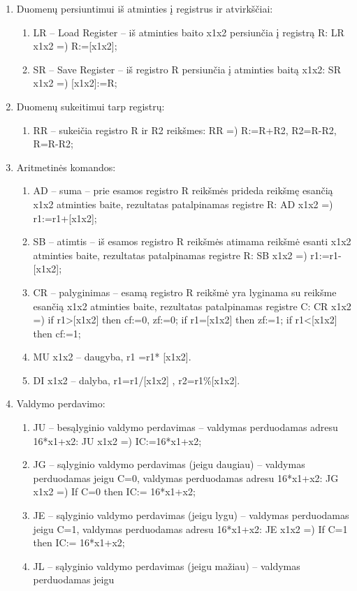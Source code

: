 \documentclass[oneside]{VUMIFPSkursinis}
\begin{document}
\begin{enumerate}
\item Duomenų persiuntimui iš atminties į registrus ir atvirkščiai:
\begin{enumerate}
\item  LR – Load Register – iš atminties baito x1x2 persiunčia į registrą R:
LR x1x2 =) R:=[x1x2];
\item SR – Save Register – iš registro R persiunčia į atminties baitą x1x2:
SR x1x2 =) [x1x2]:=R;
\end{enumerate}
\item Duomenų sukeitimui tarp registrų:
\begin{enumerate}
\item RR – sukeičia registro R ir R2 reikšmes:
RR =) R:=R+R2, R2=R-R2, R=R-R2;
\end{enumerate}
\item Aritmetinės komandos:
\begin{enumerate}
\item AD – suma – prie esamos registro R reikšmės prideda reikšmę esančią x1x2 atminties
baite, rezultatas patalpinamas registre R:
AD x1x2 =) r1:=r1+[x1x2];
\item SB – atimtis – iš esamos registro R reikšmės atimama reikšmė esanti x1x2 atminties
baite, rezultatas patalpinamas registre R:
SB x1x2 =) r1:=r1-[x1x2];
\item CR – palyginimas – esamą registro R reikšmė yra lyginama su reikšme esančią x1x2
atminties baite, rezultatas patalpinamas registre C:
CR x1x2 =)
if r1>[x1x2] then cf:=0, zf:=0;
if r1=[x1x2] then zf:=1;
if r1<[x1x2] then cf:=1;
\item MU x1x2 – daugyba, r1 =r1* [x1x2].
\item DI x1x2 – dalyba, r1=r1/[x1x2] , r2=r1\%[x1x2].
\end{enumerate}
\item Valdymo perdavimo:
\begin{enumerate}
\item JU – besąlyginio valdymo perdavimas – valdymas perduodamas adresu 16*x1+x2:
JU x1x2 =) IC:=16*x1+x2;
\item JG – sąlyginio valdymo perdavimas (jeigu daugiau) – valdymas perduodamas jeigu
C=0, valdymas perduodamas adresu 16*x1+x2:
JG x1x2 =) If C=0 then IC:= 16*x1+x2;
\item JE – sąlyginio valdymo perdavimas (jeigu lygu) – valdymas perduodamas jeigu C=1,
valdymas perduodamas adresu 16*x1+x2:
JE x1x2 =) If C=1 then IC:= 16*x1+x2;
\item JL – sąlyginio valdymo perdavimas (jeigu mažiau) – valdymas perduodamas jeigu

\end{enumerate}
\end{enumerate}
\end{document}
